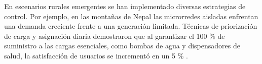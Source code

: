 En escenarios rurales emergentes se han implementado diversas estrategias de control. Por ejemplo, en las montañas de Nepal las microrredes aisladas enfrentan una demanda creciente frente a una generación limitada. Técnicas de priorización de carga y asignación diaria demostraron que al garantizar el 100 \% de suministro a las cargas esenciales, como bombas de agua y dispensadores de salud, la satisfacción de usuarios se incrementó en un 5 \% \cite{load_prioritization_nepal}.

